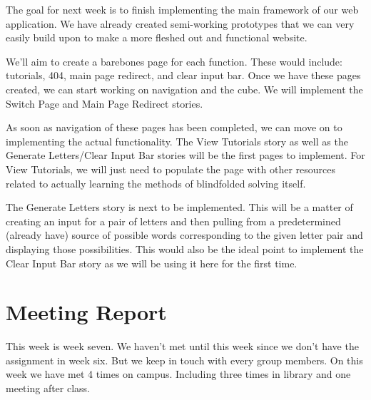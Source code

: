 \documentclass[12pt]{article}
\begin{document}
\par
The goal for next week is to finish implementing the main framework of our web application. We have already created semi-working prototypes that we can very easily build upon to make a more fleshed out and functional website. \\

\par
We’ll aim to create a barebones page for each function. These would include: tutorials, 404, main page redirect, and clear input bar. Once we have these pages created, we can start working on navigation and the cube. We will implement the Switch Page and Main Page Redirect stories.  \\

\par
As soon as navigation of these pages has been completed, we can move on to implementing the actual functionality. The View Tutorials story as well as the Generate Letters/Clear Input Bar stories will be the first pages to implement. For View Tutorials, we will just need to populate the page with other resources related to actually learning the methods of blindfolded solving itself. \\

\par
The Generate Letters story is next to be implemented. This will be a matter of creating an input for a pair of letters and then pulling from a predetermined (already have) source of possible words corresponding to the given letter pair and displaying those possibilities. This would also be the ideal point to implement the Clear Input Bar story as we will be using it here for the first time. \\

\section{Meeting Report}

\par
This week is week seven. We haven’t met until this week since we don’t have the assignment in week six. But we keep in touch with every group members. On this week we have met 4 times on campus. Including three times in library and one meeting after class. \\
\end{document}
